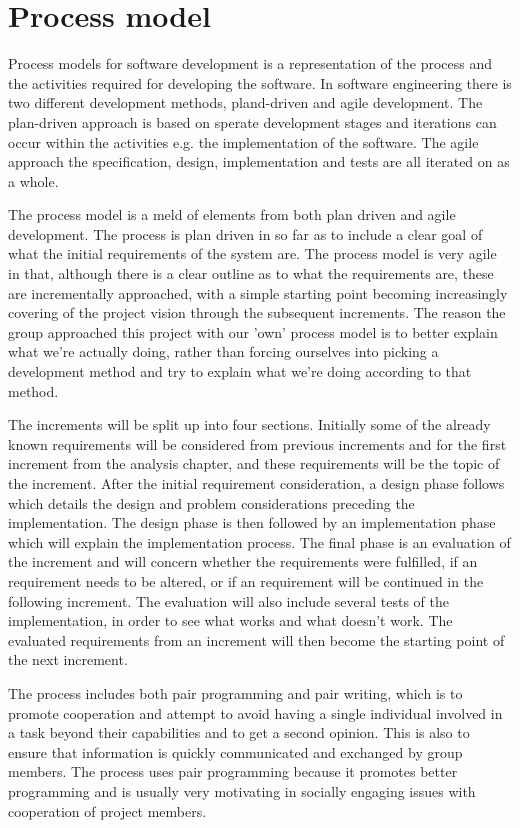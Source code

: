 \chapter{Process model}
\label{Process model}
Process models for software development is a representation of the process and the activities required for developing the software. In software engineering there is two different development methods, pland-driven and agile development. The plan-driven approach is based on sperate development stages and iterations can occur within the activities e.g. the implementation of the software. The agile approach the specification, design, implementation and tests are all iterated on as a whole. \citep{sommerville}

The process model is a meld of elements from both plan driven and agile development. The process is plan driven in so far as to include a clear goal of what the initial requirements of the system are. The process model is very agile in that, although there is a clear outline as to what the requirements are, these are incrementally approached, with a simple starting point becoming increasingly covering of the project vision through the subsequent increments. The reason the group approached this project with our 'own' process model is to better explain what we're actually doing, rather than forcing ourselves into picking a development method and try to explain what we're doing according to that method.

The increments will be split up into four sections. Initially some of the already known requirements will be considered from previous increments and for the first increment from the analysis chapter, and these requirements will be the topic of the increment.
After the initial requirement consideration, a design phase follows which details the design and problem considerations preceding the implementation. The design phase is then followed by an implementation phase which will explain the implementation process. The final phase is an evaluation of the increment and will concern whether the requirements were fulfilled, if an requirement needs to be altered, or if an requirement will be continued in the following increment. The evaluation will also include several tests of the implementation, in order to see what works and what doesn't work. The evaluated requirements from an increment will then become the starting point of the next increment. 

The process includes both pair programming and pair writing, which is to promote cooperation and attempt to avoid having a single individual involved in a task beyond their capabilities and to get a second opinion. This is also to ensure that information is quickly communicated and exchanged by group members. The process uses pair programming because it promotes better programming and is usually very motivating in socially engaging issues with cooperation of project members.


